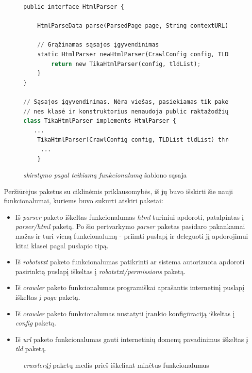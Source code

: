 \begin{figure}[H]
    \begin{lstlisting}[language=Python]
public interface HtmlParser {

    HtmlParseData parse(ParsedPage page, String contextURL) throws ParseException;

    // Grąžinamas sąsajos įgyvendinimas
    static HtmlParser newHtmlParser(CrawlConfig config, TLDList tldList) throws InstantiationException, IllegalAccessException  {
        return new TikaHtmlParser(config, tldList);
    }
}

// Sąsajos įgyvendinimas. Nėra viešas, pasiekiamas tik paketo viduje,
// nes klasė ir konstruktorius nenaudoja public raktažodžių
class TikaHtmlParser implements HtmlParser {
   ...
    TikaHtmlParser(CrawlConfig config, TLDList tldList) throws InstantiationException, IllegalAccessException {
     ...
    }
    \end{lstlisting}
    \caption{\textit{skirstymo pagal teikiamą funkcionalumą} šablono sąsaja}
\end{figure}
Peržiūrėjus paketus su ciklinėmis priklausomybės, iš jų buvo išskirti šie nauji funkcionalumai, kuriems
buvo sukurti atskiri paketai:
\begin{itemize}
    \item Iš \textit{parser} paketo iškeltas funkcionalumas \textit{html} turiniui apdoroti, patalpintas į \textit{parser/html} paketą.
    Po šio pertvarkymo \textit{parser} paketas pasidaro pakankamai mažas ir turi vieną funkcionalumą - priimti puslapį ir deleguoti jį apdorojimui kitai klasei pagal puslapio tipą.
    \item Iš \textit{robotstxt} paketo funkcionalumas patikrinti ar sistema autorizuota apdoroti pasirinktą puslapį iškeltas į \textit{robotstxt/permissions} paketą.
    \item Iš \textit{crawler} paketo funkcionalumas programiškai aprašantis internetinį puslapį iškeltas į \textit{page} paketą.
    \item Iš \textit{crawler} paketo funkcionalumas nustatyti įrankio konfigūraciją iškeltas į \textit{config} paketą.
    \item Iš \textit{url} paketo funkcionalumas gauti internetinių domenų pavadinimus iškeltas į  \textit{tld} paketą.
\end{itemize}

\begin{figure}[H]
    \snugshade
    \endsnugshade
    \caption{\textit{crawler4j} paketų medis prieš iškeliant minėtus funkcionalumus}
\end{figure}

